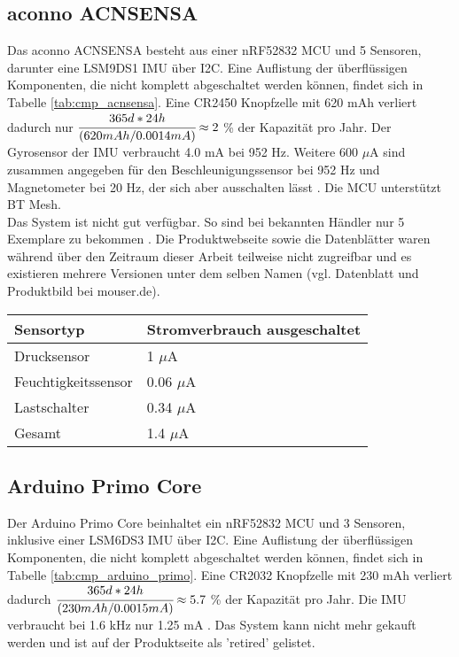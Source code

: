 \subsection{aconno ACNSENSA}
Das aconno ACNSENSA besteht aus einer nRF52832 MCU und 5 Sensoren, darunter eine LSM9DS1 IMU über I2C.
Eine Auflistung der überflüssigen Komponenten, die nicht komplett abgeschaltet werden können, findet sich in Tabelle \ref{tab:cmp_acnsensa}.
Eine CR2450 Knopfzelle mit 620 mAh verliert dadurch nur $\cfrac{365d*24h}{(620mAh/0.0014mA)} \approx 2$ \% der Kapazität pro Jahr.
Der Gyrosensor der IMU verbraucht 4.0 mA bei 952 Hz.
Weitere 600 $\mu$A sind zusammen angegeben für den Beschleunigungssensor bei 952 Hz und Magnetometer bei 20 Hz, der sich aber ausschalten lässt \cite{datasheet_lsm9ds1}.
Die MCU unterstützt BT Mesh. \cite{datasheet_acnsensa}\\
Das System ist nicht gut verfügbar.
So sind bei bekannten Händler nur 5 Exemplare zu bekommen \cite{site_mouserAcnsensa}.
Die Produktwebseite sowie die Datenblätter waren während über den Zeitraum dieser Arbeit teilweise nicht zugreifbar und es existieren mehrere Versionen unter dem selben Namen (vgl. Datenblatt und Produktbild bei mouser.de).

\begin{minipage}{\linewidth}
	\label{tab:cmp_acnsensa}
	\begin{tabularx}{\linewidth}{X|X}
		Sensortyp & Stromverbrauch ausgeschaltet\\
		\hline
    Drucksensor & 1 $\mu$A \cite{datasheet_acnsensa}\\
    Feuchtigkeitssensor & 0.06 $\mu$A \cite{datasheet_acnsensa}\\
    Lastschalter & 0.34 $\mu$A \cite{datasheet_sip32401a}\\
    \hline
    Gesamt & 1.4 $\mu$A\\
  \end{tabularx}
\end{minipage}

\subsection{Arduino Primo Core}
Der Arduino Primo Core beinhaltet ein nRF52832 MCU und 3 Sensoren, inklusive einer LSM6DS3 IMU über I2C.
Eine Auflistung der überflüssigen Komponenten, die nicht komplett abgeschaltet werden können, findet sich in Tabelle \ref{tab:cmp_arduino_primo}.
Eine CR2032 Knopfzelle mit 230 mAh verliert dadurch $\cfrac{365d*24h}{(230mAh/0.0015mA)} \approx 5.7$ \% der Kapazität pro Jahr.
Die IMU verbraucht bei 1.6 kHz nur 1.25 mA \cite{datasheet_lsm6ds3}.
Das System kann nicht mehr gekauft werden und ist auf der Produktseite als 'retired' gelistet.\cite{site_primo} \cite{datasheet_primo}

